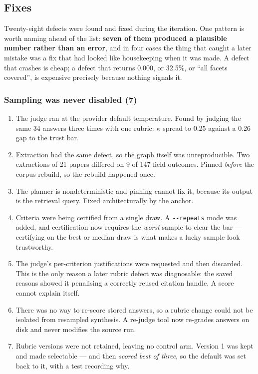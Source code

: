 \subsection{Fixes}

Twenty-eight defects were found and fixed during the iteration. One pattern is
worth naming ahead of the list: \textbf{seven of them produced a plausible
number rather than an error}, and in four cases the thing that caught a later
mistake was a fix that had looked like housekeeping when it was made. A defect
that crashes is cheap; a defect that returns 0.000, or 32.5\%, or ``all facets
covered'', is expensive precisely because nothing signals it.

\subsubsection*{Sampling was never disabled (7)}

\begin{enumerate}[label=A\arabic*.]
  \item The judge ran at the provider default temperature. Found by judging the
        same 34 answers three times with one rubric: $\kappa$ spread to 0.25
        against a 0.26 gap to the trust bar.
  \item Extraction had the same defect, so the graph itself was
        unreproducible. Two extractions of 21 papers differed on 9 of 147 field
        outcomes. Pinned \emph{before} the corpus rebuild, so the rebuild
        happened once.
  \item The planner is nondeterministic and pinning cannot fix it, because its
        output is the retrieval query. Fixed architecturally by the anchor.
  \item Criteria were being certified from a single draw. A \texttt{-{}-repeats}
        mode was added, and certification now requires the \emph{worst} sample
        to clear the bar --- certifying on the best or median draw is what makes
        a lucky sample look trustworthy.
  \item The judge's per-criterion justifications were requested and then
        discarded. This is the only reason a later rubric defect was
        diagnosable: the saved reasons showed it penalising a correctly reused
        citation handle. A score cannot explain itself.
  \item There was no way to re-score stored answers, so a rubric change could
        not be isolated from resampled synthesis. A re-judge tool now re-grades
        answers on disk and never modifies the source run.
  \item Rubric versions were not retained, leaving no control arm. Version 1 was
        kept and made selectable --- and then \emph{scored best of three}, so the
        default was set back to it, with a test recording why.
\end{enumerate}

